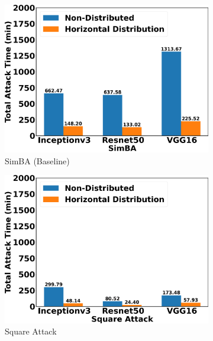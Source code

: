 \begin{figure}[tbp]
\centering
\begin{subfigure}[b]{0.32\textwidth}
    \centering
    \includegraphics[width=\textwidth]{figures/chapter_classification/simba_attack_horizontal_time.png}
    \caption{SimBA (Baseline)}
    \label{fig:simba_horizon}
\end{subfigure}
\hfill
\begin{subfigure}[b]{0.32\textwidth}
    \centering
    \includegraphics[width=\textwidth]{figures/chapter_classification/square_attack_horizontal_time.png}
    \caption{Square Attack}
    \label{fig:square_horizon}
\end{subfigure}
\hfill
\begin{subfigure}[b]{0.32\textwidth}
    \centering

\end{subfigure}
\end{figure}
